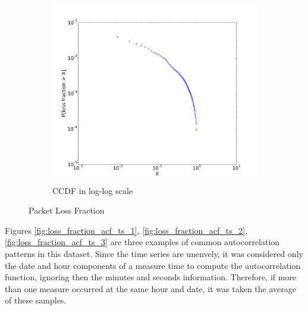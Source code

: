 \begin{figure}[H]
{\begin{subfigure}[b]{0.55\textwidth}
            \includegraphics[width=\linewidth]{./figures/ccdf.png}
            \caption{CCDF in log-log scale}
        \end{subfigure}
    }
    \caption{Packet Loss Fraction}
    \label{fig:loss_fraction_cdf_ccdf}
\end{figure}%

Figures \ref{fig:loss_fraction_acf_ts_1}, \ref{fig:loss_fraction_acf_ts_2}, \ref{fig:loss_fraction_acf_ts_3} are three examples of common autocorrelation patterns in this dataset. Since the time series are unenvely, it was considered only the date and hour components of a measure time to compute the autocorrelation function, ignoring then the minutes and seconds information. Therefore, if more than one measure occurred at the same hour and date, it was taken the average of these samples.

